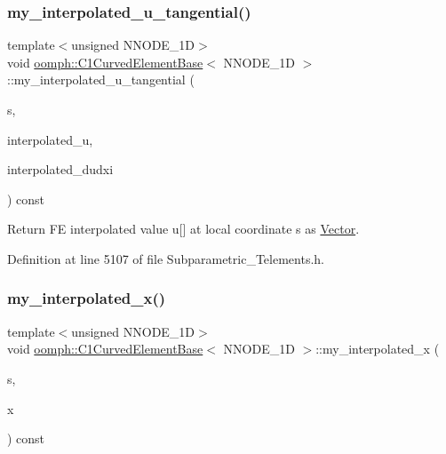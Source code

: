 \subsubsection{\texorpdfstring{my\+\_\+interpolated\+\_\+u\+\_\+tangential()}{my\_interpolated\_u\_tangential()}}
{\footnotesize\ttfamily template$<$unsigned N\+N\+O\+D\+E\+\_\+1D$>$ \\
void \hyperlink{classoomph_1_1C1CurvedElementBase}{oomph\+::\+C1\+Curved\+Element\+Base}$<$ N\+N\+O\+D\+E\+\_\+1D $>$\+::my\+\_\+interpolated\+\_\+u\+\_\+tangential (\begin{DoxyParamCaption}\item[{const \hyperlink{classoomph_1_1Vector}{Vector}$<$ double $>$}]{s,  }\item[{\hyperlink{classoomph_1_1Vector}{Vector}$<$ double $>$ \&}]{interpolated\+\_\+u,  }\item[{\hyperlink{classoomph_1_1DenseMatrix}{Dense\+Matrix}$<$ double $>$ \&}]{interpolated\+\_\+dudxi }\end{DoxyParamCaption}) const\hspace{0.3cm}{\ttfamily [inline]}}



Return FE interpolated value u\mbox{[}\mbox{]} at local coordinate s as \hyperlink{classoomph_1_1Vector}{Vector}. 



Definition at line 5107 of file Subparametric\+\_\+\+Telements.\+h.

\mbox{\label{classoomph_1_1C1CurvedElementBase_af16c55258f87849a452de6e38c13a366}} 
\subsubsection{\texorpdfstring{my\+\_\+interpolated\+\_\+x()}{my\_interpolated\_x()}}
{\footnotesize\ttfamily template$<$unsigned N\+N\+O\+D\+E\+\_\+1D$>$ \\
void \hyperlink{classoomph_1_1C1CurvedElementBase}{oomph\+::\+C1\+Curved\+Element\+Base}$<$ N\+N\+O\+D\+E\+\_\+1D $>$\+::my\+\_\+interpolated\+\_\+x (\begin{DoxyParamCaption}\item[{const \hyperlink{classoomph_1_1Vector}{Vector}$<$ double $>$ \&}]{s,  }\item[{\hyperlink{classoomph_1_1Vector}{Vector}$<$ double $>$ \&}]{x }\end{DoxyParamCaption}) const\hspace{0.3cm}{\ttfamily [inline]}}



